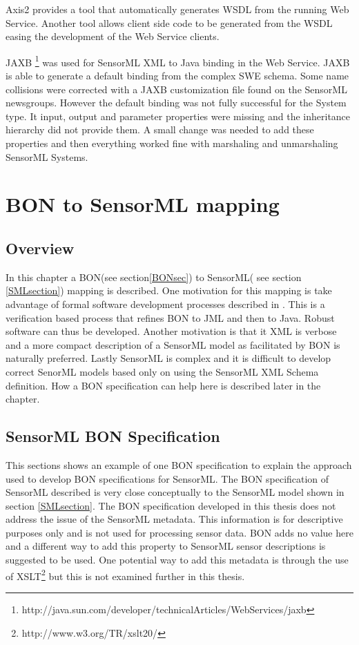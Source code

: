 \documentclass[]{final_report}
\begin{document}
Axis2 provides a tool that automatically generates WSDL from the running Web Service. Another tool allows client side code to be generated from the WSDL easing the development of the Web Service clients.

JAXB \footnote{http://java.sun.com/developer/technicalArticles/WebServices/jaxb} was used for SensorML XML to Java binding in the Web Service. JAXB is able to generate a default binding from the complex SWE schema. Some name collisions were corrected with a JAXB customization file found on the SensorML newsgroups. However the default binding was not fully successful for the System type. It input, output and parameter properties were missing and the inheritance hierarchy did not provide them. A small change was needed to add these properties and then everything worked fine with marshaling and unmarshaling SensorML Systems. 

\chapter{BON to SensorML mapping}
\section{Overview}
In this chapter a BON(see section\ref{BONsec}) to SensorML( see section \ref{SMLsection}) mapping is described. One motivation for this mapping is take advantage of formal software development processes described in \cite{Kiniryref}. This is a verification based process that refines BON to JML and then to Java. Robust software can thus be developed. Another motivation is that it XML is verbose and a more compact description of a SensorML model as facilitated by BON is naturally preferred. Lastly SensorML is complex and it is difficult to develop correct SenorML models based only on using the SensorML XML Schema definition. How a BON specification can help here is described later in the chapter.

\section{SensorML BON Specification}
This sections shows an example of one BON specification to explain the approach used to develop BON specifications for SensorML. The BON specification of SensorML described is very close conceptually to the SensorML model shown in section \ref{SMLsection}. The BON specification developed in this thesis does not address the issue of the SensorML metadata. This information  is for descriptive purposes only and is not used for processing sensor data. BON adds no value here and a different way to add this property  to SensorML sensor descriptions is suggested to be used. One potential way to add this metadata is through the use of XSLT\footnote{http://www.w3.org/TR/xslt20/} but this is not examined further in this thesis.
\end{document}
